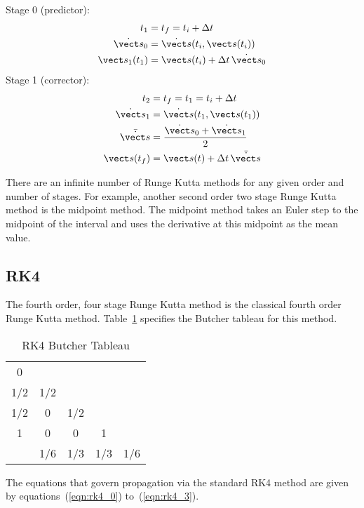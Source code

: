 Stage 0 (predictor):
\begin{equation}
\label{eqn:rk2_heun_0}
\begin{split}
t_1 &= t_f = t_i + \Delta t \\
\dot{\vect s}_0 &= \dot{\vect s}(t_i,\vect s(t_i)) \\
\vect s_1(t_1) &= \vect s(t_i) +  \Delta t\, \dot{\vect s}_0
\end{split}
\end{equation}
Stage 1 (corrector):
\begin{equation}
\label{eqn:rk2_heun_1}
\begin{split}
t_2 &= t_f = t_1 = t_i + \Delta t \\
\dot{\vect s}_1 &= \dot{\vect s}(t_1,\vect s(t_1)) \\
\bar {\dot{\vect s}} &= \frac{\dot{\vect s}_0+\dot{\vect s}_1} 2 \\ 
\vect s(t_f) &= \vect s(t) + \Delta t\, \bar {\dot{\vect s}}
\end{split}
\end{equation}

There are an infinite number of Runge Kutta methods for
any given order and number of stages.
For example, another second order two stage Runge Kutta method
is the midpoint method.
The midpoint method takes an Euler step to the midpoint of the
interval and uses the derivative at this midpoint as the mean value.

\subsection{RK4}
The fourth order, four stage Runge Kutta method is the classical fourth
order Runge Kutta method. Table~\ref{tab:rk4_butcher} specifies the
Butcher tableau for this method.
 
\begin{table}[htp]
\centering
\caption{RK4 Butcher Tableau}
\label{tab:rk4_butcher}
\vspace{1.5ex}
\begin{tabular}{c|cccc}
0 &&&& \\
1/2 & 1/2 &&& \\
1/2 & 0 & 1/2 && \\
1 & 0 & 0 & 1 & \\
\hline
& 1/6 & 1/3 & 1/3 & 1/6
\end{tabular}
\end{table}

The equations that govern propagation via the standard RK4 method are given by
equations~(\ref{eqn:rk4_0}) to~(\ref{eqn:rk4_3}).

